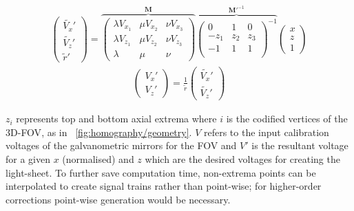 \begin{align}
  \begin{pmatrix}
  \widetilde{V_x}'\\
  \widetilde{V_z}' \\
  \widetilde{r}'
  \end{pmatrix}
  =\overbrace{
  \begin{pmatrix}
  \lambda V_{x_1} & \mu V_{x_2} & \nu V_{x_3} \\
  \lambda V_{z_1} & \mu V_{z_2} & \nu V_{z_3} \\
  \lambda & \mu & \nu
\end{pmatrix}}^{\textbf{M}}
  \overbrace{
  \begin{pmatrix}
      0 & 1 & 0 \\
      -z_1 & z_2 & z_3 \\
      -1 & 1 & 1 \\
    \end{pmatrix}^{-1}}^{\textbf{M}'^{-1}}
  \begin{pmatrix}
  x\\
  z \\
  1
  \end{pmatrix}\nonumber
\end{align}
  \begin{align}
  \begin{pmatrix}
    V_x'\\
    V_z'
  \end{pmatrix} = \frac{1}{\widetilde{r}}
  \begin{pmatrix}
  \widetilde{V_x}'\\
  \widetilde{V_z}'
  \end{pmatrix}
\end{align}

\(z_i\) represents top and bottom axial extrema where \(i\) is the codified vertices of the \gls{3D}-\gls{FOV}, as in \figurename~\ref{fig:homography/geometry}.
\(V\) refers to the input calibration voltages of the galvanometric mirrors for the \gls{FOV} and \(V' \) is the resultant voltage for a given \(x \) (normalised) and \(z\) which are the desired voltages for creating the  \gls{light-sheet}.
To further save computation time,
non-extrema points can be interpolated to create signal trains rather than point-wise; for higher-order corrections point-wise generation would be necessary.


